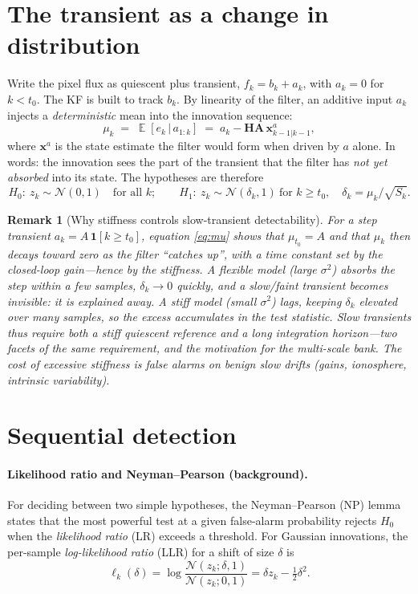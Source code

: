 \documentclass[11pt]{article}
\newtheorem{remark}{Remark}
\DeclareMathOperator{\E}{\mathbb{E}}
\newcommand{\Norm}{\mathcal{N}}
\newcommand{\given}{\,|\,}
\newcommand{\half}{\tfrac{1}{2}}
\begin{document}
\section{The transient as a change in distribution}
\label{sec:change}

Write the pixel flux as quiescent plus transient, $f_k=b_k+a_k$, with $a_k=0$ for
$k<t_0$. The KF is built to track $b_k$. By linearity of the filter, an additive input
$a_k$ injects a \emph{deterministic} mean into the innovation sequence:
\begin{equation}
  \mu_k \;=\; \E[e_k\given a_{1:k}] \;=\; a_k - \bm{H}\bm{A}\,\bm{x}^{a}_{k-1|k-1},
  \label{eq:mu}
\end{equation}
where $\bm{x}^{a}$ is the state estimate the filter would form when driven by $a$
alone. In words: the innovation sees the part of the transient that the filter has
\emph{not yet absorbed} into its state. The hypotheses are therefore
\begin{equation}
  H_0:\ z_k\sim\Norm(0,1)\quad\text{for all }k;
  \qquad
  H_1:\ z_k\sim\Norm(\delta_k,1)\ \text{for }k\ge t_0,\quad \delta_k=\mu_k/\sqrt{S_k}.
\end{equation}

\begin{remark}[Why stiffness controls slow-transient detectability]
For a step transient $a_k=A\,\mathbf{1}[k\ge t_0]$, equation \eqref{eq:mu} shows that
$\mu_{t_0}=A$ and that $\mu_k$ then decays toward zero as the filter ``catches up'',
with a time constant set by the closed-loop gain---hence by the stiffness. A
\emph{flexible} model (large $\sigma^2$) absorbs the step within a few samples,
$\delta_k\to0$ quickly, and a slow/faint transient becomes invisible: it is
\emph{explained away}. A \emph{stiff} model (small $\sigma^2$) lags, keeping
$\delta_k$ elevated over many samples, so the excess accumulates in the test
statistic. Slow transients thus require both a stiff quiescent reference and a long
integration horizon---two facets of the same requirement, and the motivation for the
multi-scale bank. The cost of excessive stiffness is false alarms on benign slow
drifts (gains, ionosphere, intrinsic variability).
\end{remark}

\section{Sequential detection}
\label{sec:seqdet}

\paragraph{Likelihood ratio and Neyman--Pearson (background).}
For deciding between two simple hypotheses, the Neyman--Pearson (NP) lemma states that
the most powerful test at a given false-alarm probability rejects $H_0$ when the
\emph{likelihood ratio} (LR) exceeds a threshold. For Gaussian innovations, the
per-sample \emph{log-likelihood ratio} (LLR) for a shift of size $\delta$ is
\begin{equation}
  \ell_k(\delta) = \log\frac{\Norm(z_k;\delta,1)}{\Norm(z_k;0,1)}
                 = \delta z_k - \half\delta^2 .
  \label{eq:llr}
\end{equation}
\end{document}
